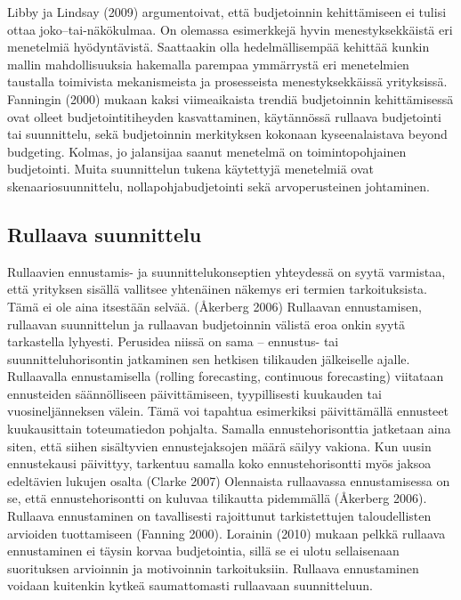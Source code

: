 \documentclass[12pt,a4paper,oneside,pdftex]{report}
\begin{document}
Libby ja Lindsay (2009) argumentoivat, että budjetoinnin kehittämiseen ei tulisi ottaa joko–tai-näkökulmaa. On olemassa esimerkkejä hyvin menestyksekkäistä eri menetelmiä hyödyntävistä. Saattaakin olla hedelmällisempää kehittää kunkin mallin mahdollisuuksia hakemalla parempaa ymmärrystä eri menetelmien taustalla toimivista mekanismeista ja prosesseista menestyksekkäissä yrityksissä. Fanningin (2000) mukaan kaksi viimeaikaista trendiä budjetoinnin kehittämisessä ovat olleet budjetointitiheyden kasvattaminen, käytännössä rullaava budjetointi tai suunnittelu, sekä budjetoinnin merkityksen kokonaan kyseenalaistava beyond budgeting. Kolmas, jo jalansijaa saanut menetelmä on toimintopohjainen budjetointi. Muita suunnittelun tukena käytettyjä menetelmiä ovat skenaariosuunnittelu, nollapohjabudjetointi sekä arvoperusteinen johtaminen.

\subsection{Rullaava suunnittelu}

Rullaavien ennustamis- ja suunnittelukonseptien yhteydessä on syytä varmistaa, että yrityksen sisällä vallitsee yhtenäinen näkemys eri termien tarkoituksista. Tämä ei ole aina itsestään selvää. (Åkerberg 2006) Rullaavan ennustamisen, rullaavan suunnittelun ja rullaavan budjetoinnin välistä eroa onkin syytä tarkastella lyhyesti. Perusidea niissä on sama – ennustus- tai suunnitteluhorisontin jatkaminen sen hetkisen tilikauden jälkeiselle ajalle.
Rullaavalla ennustamisella (rolling forecasting, continuous forecasting) viitataan ennusteiden säännölliseen päivittämiseen, tyypillisesti kuukauden tai vuosineljänneksen välein. Tämä voi tapahtua esimerkiksi päivittämällä ennusteet kuukausittain toteumatiedon pohjalta. Samalla ennustehorisonttia jatketaan aina siten, että siihen sisältyvien ennustejaksojen määrä säilyy vakiona. Kun uusin ennustekausi päivittyy,  tarkentuu samalla koko ennustehorisontti myös jaksoa edeltävien lukujen osalta (Clarke 2007) Olennaista rullaavassa ennustamisessa on se, että ennustehorisontti on kuluvaa tilikautta pidemmällä (Åkerberg 2006). Rullaava ennustaminen on tavallisesti rajoittunut tarkistettujen taloudellisten arvioiden tuottamiseen (Fanning 2000).
Lorainin (2010) mukaan pelkkä rullaava ennustaminen ei täysin korvaa budjetointia, sillä se ei ulotu sellaisenaan suorituksen arvioinnin ja motivoinnin tarkoituksiin. Rullaava ennustaminen voidaan kuitenkin kytkeä saumattomasti rullaavaan suunnitteluun.
\end{document}
